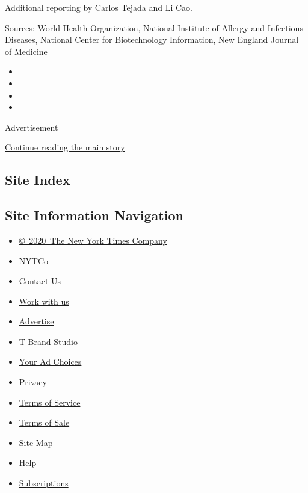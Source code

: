 Additional reporting by Carlos Tejada and Li Cao.

Sources: World Health Organization, National Institute of Allergy and
Infectious Diseases, National Center for Biotechnology Information, New
England Journal of Medicine

\begin{itemize}
\item
\item
\item
\item
\end{itemize}

Advertisement

\protect\hyperlink{after-bottom}{Continue reading the main story}

\hypertarget{site-index}{%
\subsection{Site Index}\label{site-index}}

\hypertarget{site-information-navigation}{%
\subsection{Site Information
Navigation}\label{site-information-navigation}}

\begin{itemize}
\tightlist
\item
  \href{https://help.nytimes3xbfgragh.onion/hc/en-us/articles/115014792127-Copyright-notice}{©~2020~The
  New York Times Company}
\end{itemize}

\begin{itemize}
\tightlist
\item
  \href{https://www.nytco.com/}{NYTCo}
\item
  \href{https://help.nytimes3xbfgragh.onion/hc/en-us/articles/115015385887-Contact-Us}{Contact
  Us}
\item
  \href{https://www.nytco.com/careers/}{Work with us}
\item
  \href{https://nytmediakit.com/}{Advertise}
\item
  \href{http://www.tbrandstudio.com/}{T Brand Studio}
\item
  \href{https://www.nytimes3xbfgragh.onion/privacy/cookie-policy\#how-do-i-manage-trackers}{Your
  Ad Choices}
\item
  \href{https://www.nytimes3xbfgragh.onion/privacy}{Privacy}
\item
  \href{https://help.nytimes3xbfgragh.onion/hc/en-us/articles/115014893428-Terms-of-service}{Terms
  of Service}
\item
  \href{https://help.nytimes3xbfgragh.onion/hc/en-us/articles/115014893968-Terms-of-sale}{Terms
  of Sale}
\item
  \href{https://spiderbites.nytimes3xbfgragh.onion}{Site Map}
\item
  \href{https://help.nytimes3xbfgragh.onion/hc/en-us}{Help}
\item
  \href{https://www.nytimes3xbfgragh.onion/subscription?campaignId=37WXW}{Subscriptions}
\end{itemize}
